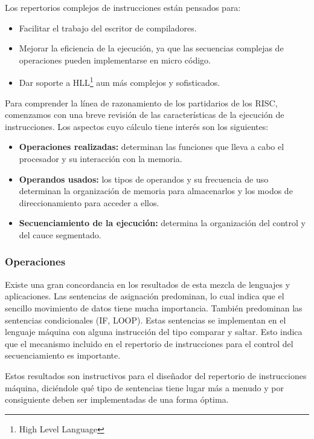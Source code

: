 Los repertorios complejos de instrucciones están pensados para:

\begin{itemize}
  \item Facilitar el trabajo del escritor de compiladores.
  \item Mejorar la eficiencia de la ejecución, ya que las secuencias complejas de operaciones pueden implementarse en micro código.
  \item Dar soporte a HLL\footnote{High Level Language} aun más complejos y sofisticados.
\end{itemize}

Para comprender la línea de razonamiento de los partidarios de los RISC, comenzamos con una breve revisión de las características de la ejecución de instrucciones. Los aspectos cuyo cálculo tiene interés son los siguientes:

\begin{itemize}
  \item \textbf{Operaciones realizadas:} determinan las funciones que lleva a cabo el procesador y su interacción con la memoria.
  \item \textbf{Operandos usados:} los tipos de operandos y su frecuencia de uso determinan la organización de memoria para almacenarlos y los modos de direccionamiento para acceder a ellos.
  \item \textbf{Secuenciamiento de la ejecución:} determina la organización del control y del cauce segmentado.
\end{itemize}

\subsubsection*{Operaciones}

Existe una gran concordancia en los resultados de esta mezcla de lenguajes y aplicaciones. Las sentencias de asignación predominan, lo cual indica que el sencillo movimiento de datos tiene mucha importancia. También predominan las sentencias condicionales (IF, LOOP). Estas sentencias se implementan en el lenguaje máquina con alguna instrucción del tipo comparar y saltar. Esto indica que el mecanismo incluido en el repertorio de instrucciones para el control del secuenciamiento es importante.

Estos resultados son instructivos para el diseñador del repertorio de instrucciones máquina, diciéndole qué tipo de sentencias tiene lugar más a menudo y por consiguiente deben ser implementadas de una forma óptima.

